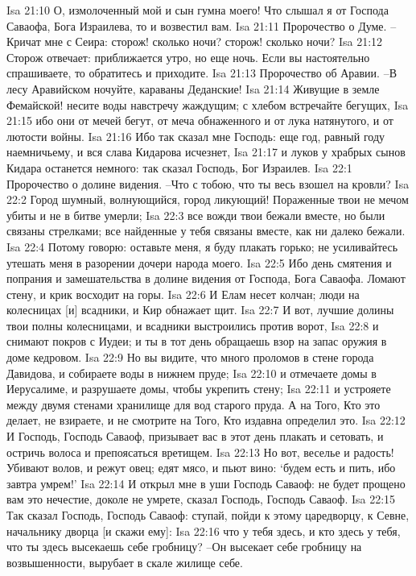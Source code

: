 Isa 21:10  О, измолоченный мой и сын гумна моего! Что слышал я от Господа Саваофа, Бога Израилева, то и возвестил вам.
Isa 21:11  Пророчество о Думе. --Кричат мне с Сеира: сторож! сколько ночи? сторож! сколько ночи?
Isa 21:12  Сторож отвечает: приближается утро, но еще ночь. Если вы настоятельно спрашиваете, то обратитесь и приходите.
Isa 21:13  Пророчество об Аравии. --В лесу Аравийском ночуйте, караваны Деданские!
Isa 21:14  Живущие в земле Фемайской! несите воды навстречу жаждущим; с хлебом встречайте бегущих,
Isa 21:15  ибо они от мечей бегут, от меча обнаженного и от лука натянутого, и от лютости войны.
Isa 21:16  Ибо так сказал мне Господь: еще год, равный году наемничьему, и вся слава Кидарова исчезнет,
Isa 21:17  и луков у храбрых сынов Кидара останется немного: так сказал Господь, Бог Израилев.
Isa 22:1  Пророчество о долине видения. --Что с тобою, что ты весь взошел на кровли?
Isa 22:2  Город шумный, волнующийся, город ликующий! Пораженные твои не мечом убиты и не в битве умерли;
Isa 22:3  все вожди твои бежали вместе, но были связаны стрелками; все найденные у тебя связаны вместе, как ни далеко бежали.
Isa 22:4  Потому говорю: оставьте меня, я буду плакать горько; не усиливайтесь утешать меня в разорении дочери народа моего.
Isa 22:5  Ибо день смятения и попрания и замешательства в долине видения от Господа, Бога Саваофа. Ломают стену, и крик восходит на горы.
Isa 22:6  И Елам несет колчан; люди на колесницах [и] всадники, и Кир обнажает щит.
Isa 22:7  И вот, лучшие долины твои полны колесницами, и всадники выстроились против ворот,
Isa 22:8  и снимают покров с Иудеи; и ты в тот день обращаешь взор на запас оружия в доме кедровом.
Isa 22:9  Но вы видите, что много проломов в стене города Давидова, и собираете воды в нижнем пруде;
Isa 22:10  и отмечаете домы в Иерусалиме, и разрушаете домы, чтобы укрепить стену;
Isa 22:11  и устрояете между двумя стенами хранилище для вод старого пруда. А на Того, Кто это делает, не взираете, и не смотрите на Того, Кто издавна определил это.
Isa 22:12  И Господь, Господь Саваоф, призывает вас в этот день плакать и сетовать, и остричь волоса и препоясаться вретищем.
Isa 22:13  Но вот, веселье и радость! Убивают волов, и режут овец; едят мясо, и пьют вино: `будем есть и пить, ибо завтра умрем!'
Isa 22:14  И открыл мне в уши Господь Саваоф: не будет прощено вам это нечестие, доколе не умрете, сказал Господь, Господь Саваоф.
Isa 22:15  Так сказал Господь, Господь Саваоф: ступай, пойди к этому царедворцу, к Севне, начальнику дворца [и скажи ему]:
Isa 22:16  что у тебя здесь, и кто здесь у тебя, что ты здесь высекаешь себе гробницу? --Он высекает себе гробницу на возвышенности, вырубает в скале жилище себе.
